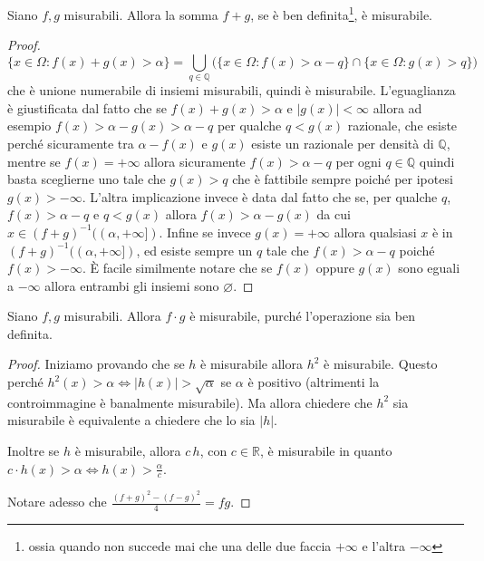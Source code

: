 \begin{proposition}
    Siano \(f, g\) misurabili. Allora la somma \(f+g\), se è ben
    definita\footnote{ossia quando non succede mai che una delle due faccia
    \(+\infty\) e l'altra \(-\infty\)}, è
    misurabile.
\end{proposition}
\begin{proof}
    \[
        \{x \in \Omega : f(x) + g(x) > \alpha\} = \bigcup_{q \in \mathbb{Q}}
        \big( \{x \in \Omega : f(x) > \alpha - q\} \cap \{x \in \Omega: g(x) >
            q\} \big)
    \]
    che è unione numerabile di insiemi misurabili, quindi è misurabile.
    L'eguaglianza è giustificata dal fatto che se \(f(x) + g(x) > \alpha\) e
    \(|g(x)| < \infty\) 
    allora ad esempio \(f(x) > \alpha - g(x) > \alpha - q\) per qualche \(q <
    g(x)\) razionale, che esiste perché sicuramente tra \(\alpha - f(x)\) e
    \(g(x)\) esiste un razionale per densità di \(\mathbb{Q}\), mentre se \(f(x)
    = +\infty\) allora sicuramente \(f(x) > \alpha - q\) per ogni \(q \in
    \mathbb{Q}\) quindi basta sceglierne uno tale che \(g(x) > q\) che è
    fattibile sempre poiché per ipotesi \(g(x) > -\infty\). L'altra
    implicazione invece è data dal fatto che se, per
    qualche \(q\), \(f(x) > \alpha - q\) e \(q < g(x)\) allora \(f(x) > \alpha -
    g(x)\) da cui \(x \in {(f+g)}^{-1}((\alpha, +\infty])\). Infine se invece \(g(x) =
    +\infty\) allora qualsiasi \(x\) è in \({(f+g)}^{-1}((\alpha, +\infty])\),
    ed esiste sempre un \(q\) tale che \(f(x) > \alpha - q\) poiché \(f(x) >
    -\infty\). È facile similmente notare che se \(f(x)\) oppure \(g(x)\) sono
    eguali a \(-\infty\) allora entrambi gli insiemi sono \(\varnothing\).
\end{proof}

\begin{proposition}
    Siano \(f, g\) misurabili. Allora \(f\cdot g\) è misurabile, purché
    l'operazione sia ben definita.
\end{proposition}
\begin{proof}
    Iniziamo provando che se \(h\) è misurabile allora \(h^{2}\) è misurabile.
    Questo perché \(h^2(x) > \alpha \iff |h(x)| > \sqrt{\alpha}\) se \(\alpha\)
    è positivo (altrimenti la controimmagine è banalmente misurabile). Ma allora
    chiedere che \(h^2\) sia misurabile è equivalente a chiedere che lo sia
    \(|h|\).

    Inoltre se \(h\) è misurabile, allora \(c\, h\), con \(c \in \mathbb{R}\),
    è misurabile in quanto \(c\cdot h(x) > \alpha \iff h(x) >
    \frac{\alpha}{c}\).

    Notare adesso che \(\displaystyle \frac{{(f+g)}^2 - {(f-g)}^2}{4} = fg\). 
\end{proof}

